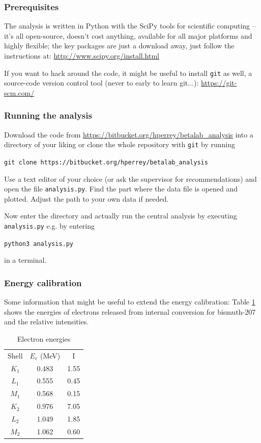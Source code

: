 \documentclass[a4,11pt, notitlepage]{article}
\begin{document}
\subsubsection{Prerequisites}
\label{sec:prerequisites}

The analysis is written in Python with the SciPy tools for scientific
computing -- it's all open-source, doesn't cost anything, available
for all major platforms and highly flexible; the key packages are just
a download away, just follow the instructions at: \url{http://www.scipy.org/install.html}

If you want to hack around the code, it might be useful to install
\texttt{git} as well, a source-code version control tool (never to
early to learn git$\ldots$): \url{https://git-scm.com/}

\subsubsection{Running the analysis}
\label{sec:running-analysis}

Download the code from
\url{https://bitbucket.org/hperrey/betalab_analysis} into a directory
of your liking or clone the whole repository with \texttt{git} by running

\texttt{git clone https://bitbucket.org/hperrey/betalab_analysis}

Use a text editor of your choice (or ask the supervisor for
recommendations) and open the file \texttt{analysis.py}. Find the part
where the data file is opened and plotted. Adjust the path to your own
data if needed.

Now enter the directory and actually run the central analysis by executing \texttt{analysis.py} e.g. by
entering

\texttt{python3 analysis.py}

in a terminal.

\subsubsection{Energy calibration}
\label{sec:energy-calib}

Some information that might be useful to extend the energy
calibration: Table \ref{tab:calib} shows the energies of electrons released from
internal conversion for bismuth-207 and the relative intensities.

\begin{table}[]
\caption{Electron energies}
\label{tab:calib}
\centering
\begin{tabular}{ccc}
Shell & $E_{e}$ (MeV) & I \\
$K_1$ & 0.483 & 1.55 \\
$L_1$ & 0.555 & 0.45 \\
$M_1$ & 0.568 & 0.15 \\
$K_2$ & 0.976 & 7.05 \\
$L_2$ & 1.049 & 1.85 \\
$M_2$ & 1.062 & 0.60 
\end{tabular}
\end{table}
\end{document}
